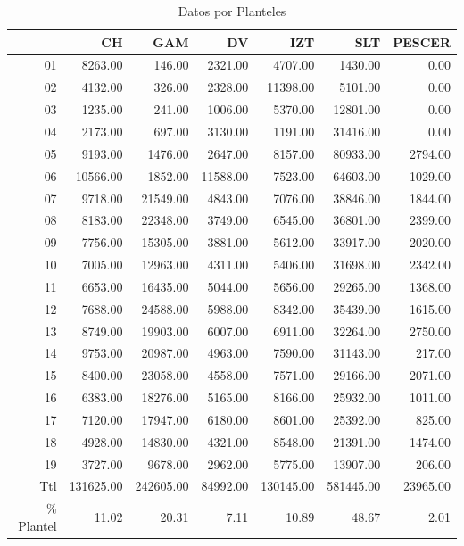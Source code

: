 \documentclass[12pt]{article}
\begin{document}
\begin{table}[ht]
\centering
\caption{Datos por Planteles} 
\begin{tabular}{r|rrrrrr}
  \hline
 & CH & GAM & DV & IZT & SLT & PESCER \\ 
  \hline
  01 & 8263.00 & 146.00 & 2321.00 & 4707.00 & 1430.00 & 0.00 \\ 
  02 & 4132.00 & 326.00 & 2328.00 & 11398.00 & 5101.00 & 0.00 \\ 
  03 & 1235.00 & 241.00 & 1006.00 & 5370.00 & 12801.00 & 0.00 \\ 
  04 & 2173.00 & 697.00 & 3130.00 & 1191.00 & 31416.00 & 0.00 \\ 
  05 & 9193.00 & 1476.00 & 2647.00 & 8157.00 & 80933.00 & 2794.00 \\ 
  06 & 10566.00 & 1852.00 & 11588.00 & 7523.00 & 64603.00 & 1029.00 \\ 
  07 & 9718.00 & 21549.00 & 4843.00 & 7076.00 & 38846.00 & 1844.00 \\ 
  08 & 8183.00 & 22348.00 & 3749.00 & 6545.00 & 36801.00 & 2399.00 \\ 
  09 & 7756.00 & 15305.00 & 3881.00 & 5612.00 & 33917.00 & 2020.00 \\ 
  10 & 7005.00 & 12963.00 & 4311.00 & 5406.00 & 31698.00 & 2342.00 \\ 
  11 & 6653.00 & 16435.00 & 5044.00 & 5656.00 & 29265.00 & 1368.00 \\ 
  12 & 7688.00 & 24588.00 & 5988.00 & 8342.00 & 35439.00 & 1615.00 \\ 
  13 & 8749.00 & 19903.00 & 6007.00 & 6911.00 & 32264.00 & 2750.00 \\ 
  14 & 9753.00 & 20987.00 & 4963.00 & 7590.00 & 31143.00 & 217.00 \\ 
  15 & 8400.00 & 23058.00 & 4558.00 & 7571.00 & 29166.00 & 2071.00 \\ 
  16 & 6383.00 & 18276.00 & 5165.00 & 8166.00 & 25932.00 & 1011.00 \\ 
  17 & 7120.00 & 17947.00 & 6180.00 & 8601.00 & 25392.00 & 825.00 \\ 
  18 & 4928.00 & 14830.00 & 4321.00 & 8548.00 & 21391.00 & 1474.00 \\ 
  19 & 3727.00 & 9678.00 & 2962.00 & 5775.00 & 13907.00 & 206.00 \\ \hline
  Ttl & 131625.00 & 242605.00 & 84992.00 & 130145.00 & 581445.00 & 23965.00 \\ \hline
  \% Plantel & 11.02 & 20.31 & 7.11 & 10.89 & 48.67 & 2.01 \\ 
   \hline
\end{tabular}
\end{table}
\end{document}
